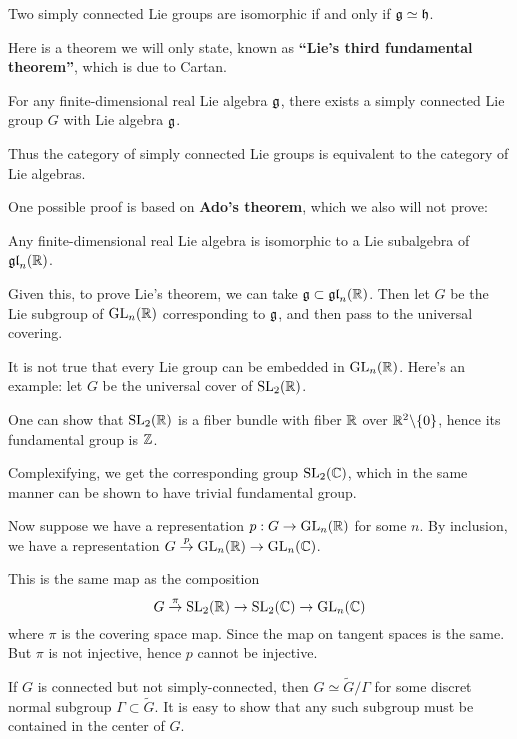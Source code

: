 \documentclass[11pt, english]{article}
\begin{document}
\begin{corr}
 Two simply connected Lie groups are isomorphic if and only if $\mathfrak g \simeq \mathfrak h$.
\end{corr}

Here is a theorem we will only state, known as \textbf{``Lie's third fundamental theorem''}, which is due to Cartan.

\begin{thm}
For any finite-dimensional real Lie algebra $\mathfrak g$, there exists a simply connected Lie group $G$ with Lie algebra $\mathfrak g$.
\end{thm}

Thus the category of simply connected Lie groups is equivalent to the category of Lie algebras.

One possible proof is based on \textbf{Ado's theorem}, which we also will not prove: 

\begin{thm}
Any finite-dimensional real Lie algebra is isomorphic to a Lie subalgebra of $\mathfrak{gl}_n(\mathbb{R})$.
\end{thm}

Given this, to prove Lie's theorem, we can take $\mathfrak g \subset \mathfrak{gl}_n(\mathbb{R})$. Then let $G$ be the Lie subgroup of $\operatorname{GL}_n(\mathbb{R})$ corresponding to $\mathfrak g$, and then pass to the universal covering.

\begin{remark}
  It is not true that every Lie group can be embedded in $\operatorname{GL}_n(\mathbb{R})$. Here's an example: let $G$ be the universal cover of $\operatorname{SL}_2(\mathbb{R})$. 

One can show that $\operatorname{SL}_2(\mathbb{R})$ is a fiber bundle with fiber $\mathbb{R}$ over $\mathbb{R}^2 \backslash \{ 0\}$, hence its fundamental group is $\mathbb{Z}$.

Complexifying, we get the corresponding group $\operatorname{SL}_2(\mathbb{C})$, which in the same manner can be shown to have trivial fundamental group.

Now suppose we have a representation $p:G \to \operatorname{GL}_n(\mathbb{R})$ for some $n$. By inclusion, we have a representation $G \stackrel{p}\to \operatorname{GL}_n(\mathbb{R}) \to \operatorname{GL}_n(\mathbb{C})$. 

This is the same map as the composition
$$
G \stackrel{\pi}{\to} \operatorname{SL}_2(\mathbb{R}) \to \operatorname{SL}_2(\mathbb{C}) \to \operatorname{GL}_n(\mathbb{C})
$$
where $\pi$ is the covering space map. Since the map on tangent spaces is the same. But $\pi$ is not injective, hence $p$ cannot be injective.
\end{remark}

If $G$ is connected but not simply-connected, then $G \simeq \widetilde G / \Gamma$ for some discret normal subgroup $\Gamma \subset \widetilde G$. It is easy to show that any such subgroup must be contained in the center of $G$.
\end{document}

